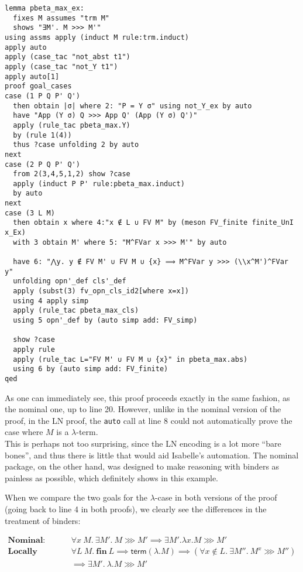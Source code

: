 \documentclass[a4paper, 12pt, twoside]{style/ociamthesis}
\theoremstyle{plain}
\theoremstyle{definition}
\theoremstyle{remark}
\newcommand{\trm}{\textsf{term}}
\begin{document}
\begin{verbatim}
lemma pbeta_max_ex:
  fixes M assumes "trm M"
  shows "∃M'. M >>> M'"
using assms apply (induct M rule:trm.induct)
apply auto
apply (case_tac "not_abst t1")
apply (case_tac "not_Y t1")
apply auto[1]
proof goal_cases
case (1 P Q P' Q')
  then obtain |σ| where 2: "P = Y σ" using not_Y_ex by auto
  have "App (Y σ) Q >>> App Q' (App (Y σ) Q')"
  apply (rule_tac pbeta_max.Y)
  by (rule 1(4))
  thus ?case unfolding 2 by auto
next
case (2 P Q P' Q')
  from 2(3,4,5,1,2) show ?case
  apply (induct P P' rule:pbeta_max.induct)
  by auto
next
case (3 L M)
  then obtain x where 4:"x ∉ L ∪ FV M" by (meson FV_finite finite_UnI x_Ex)
  with 3 obtain M' where 5: "M^FVar x >>> M'" by auto

  have 6: "⋀y. y ∉ FV M' ∪ FV M ∪ {x} ⟹ M^FVar y >>> (\\x^M')^FVar y"
  unfolding opn'_def cls'_def 
  apply (subst(3) fv_opn_cls_id2[where x=x])
  using 4 apply simp
  apply (rule_tac pbeta_max_cls)
  using 5 opn'_def by (auto simp add: FV_simp)

  show ?case
  apply rule
  apply (rule_tac L="FV M' ∪ FV M ∪ {x}" in pbeta_max.abs)
  using 6 by (auto simp add: FV_finite)
qed
\end{verbatim}

As one can immediately see, this proof proceeds exactly in the same
fashion, as the nominal one, up to line 20. However, unlike in the
nominal version of the proof, in the LN proof, the \texttt{auto} call at
line 8 could not automatically prove the case where \(M\) is a
\(\lambda\)-term.\\
This is perhaps not too surprising, since the LN encoding is a lot more
``bare bones'', and thus there is little that would aid Isabelle's
automation. The nominal package, on the other hand, was designed to make
reasoning with binders as painless as possible, which definitely shows
in this example.

When we compare the two goals for the \(\lambda\)-case in both versions
of the proof (going back to line 4 in both proofs), we clearly see the
differences in the treatment of binders:

\begin{center}
$\begin{aligned}
\textbf{Nominal:}\ \ &\forall x\ M.\ \exists M'.\ M \ggg M' \implies \exists M'. \lambda x. M \ggg M'\\
\textbf{Locally nameless:}\ \ &\forall L\ M.\ \textbf{fin}\ L \implies \trm(\lambda.M) \implies (\forall x \not\in L.\ \exists M''.\ M^x \ggg M'')\\
&\implies \exists M'.\ \lambda.M \ggg M'
\end{aligned}$
\end{center}
\end{document}

